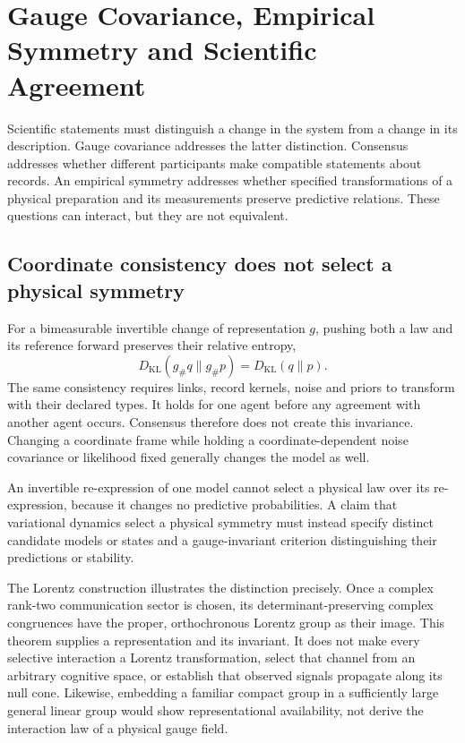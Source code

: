 \section{Gauge Covariance, Empirical Symmetry and Scientific Agreement}\label{sec:gauge_invariance_consensus}

Scientific statements must distinguish a change in the system from a change in its description. Gauge covariance addresses the latter distinction. Consensus addresses whether different participants make compatible statements about records. An empirical symmetry addresses whether specified transformations of a physical preparation and its measurements preserve predictive relations. These questions can interact, but they are not equivalent.

\subsection{Coordinate consistency does not select a physical symmetry}

For a bimeasurable invertible change of representation $g$, pushing both a law and its reference forward preserves their relative entropy,
\begin{equation}
D_{\mathrm{KL}}(g_\#q\|g_\#p)=D_{\mathrm{KL}}(q\|p).
\label{eq:science_coordinate_consistency}
\end{equation}
The same consistency requires links, record kernels, noise and priors to transform with their declared types. It holds for one agent before any agreement with another agent occurs. Consensus therefore does not create this invariance. Changing a coordinate frame while holding a coordinate-dependent noise covariance or likelihood fixed generally changes the model as well.

\begin{remark}
\label{rem:kretschmann}
An invertible re-expression of one model cannot select a physical law over its re-expression, because it changes no predictive probabilities. A claim that variational dynamics select a physical symmetry must instead specify distinct candidate models or states and a gauge-invariant criterion distinguishing their predictions or stability.
\end{remark}

The Lorentz construction illustrates the distinction precisely. Once a complex rank-two communication sector is chosen, its determinant-preserving complex congruences have the proper, orthochronous Lorentz group as their image. This theorem supplies a representation and its invariant. It does not make every selective interaction a Lorentz transformation, select that channel from an arbitrary cognitive space, or establish that observed signals propagate along its null cone. Likewise, embedding a familiar compact group in a sufficiently large general linear group would show representational availability, not derive the interaction law of a physical gauge field.

